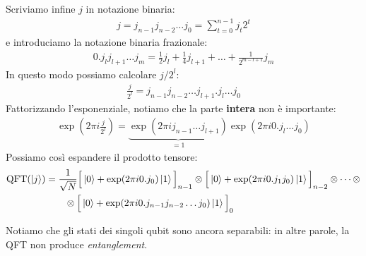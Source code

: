 \documentclass[../../InformazioneQuantistica.tex]{subfiles}
\begin{document}
Scriviamo infine $j$ in notazione binaria:
\begin{align*}
    j = j_{n-1}j_{n-2}\dots j_0 = \sum_{t=0}^{n-1} j_t 2^t
\end{align*}
e introduciamo la notazione binaria frazionale:
\begin{align*}
    0.j_l j_{l+1} \dots j_m = \frac{1}{2} j_l + \frac{1}{4} j_{l+1} + \dots + \frac{1}{2^{m-l+1}} j_m
\end{align*}
In questo modo possiamo calcolare $j/2^l$:
\begin{align*}
    \frac{j}{2^l} = j_{n-1} j_{n-2} \dots j_{l+1}.j_l \dots j_0
\end{align*}
Fattorizzando l'esponenziale, notiamo che la parte \textbf{intera} non è importante:
\begin{align*}
    \exp\left(2\pi i\frac{j}{2^l} \right) = \underbrace{\exp\left( 2\pi i j_{n-1}\dots j_{l+1} \right)}_{=1} \exp\left( 2\pi i 0.j_l \dots j_0 \right)
\end{align*}
Possiamo così espandere il prodotto tensore:
\begin{align}
    \operatorname{QFT}(\Ket{j}) &= \frac{1}{\sqrt{N}} \Big[ \Ket{0} + \exp(2\pi i 0.j_0) \Ket{1}\Big]_{n-1} \otimes \Big[\Ket{0} + \exp(2\pi i 0.j_1 j_0 ) \Ket{1}\Big]_{n-2} \otimes \cdots \otimes \\
    &\qquad \otimes\Big[\Ket{0} + \exp(2\pi i 0.j_{n-1} j_{n-2}\dots j_0)\Ket{1} \Big]_0 
    \label{eqn:QFT-f}
\end{align}

Notiamo che gli stati dei singoli qubit sono ancora separabili: in altre parole, la QFT non produce \textit{entanglement}.\\
\end{document}
